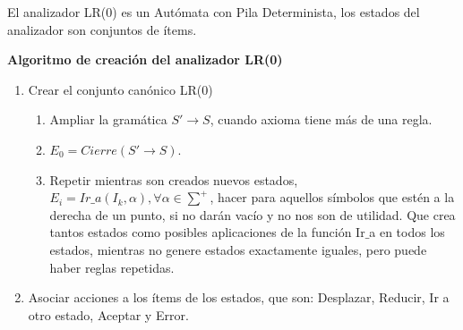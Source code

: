 \documentclass[12pt]{report} %
\begin{document}
El analizador LR(0) es un Autómata con Pila Determinista, los estados del analizador son conjuntos de ítems.

\textbf{Algoritmo de creación del analizador LR(0)}
\begin{enumerate}
  \item Crear el conjunto canónico LR(0)
  \begin{enumerate}
    \item Ampliar la gramática $S'\rightarrow S$, cuando axioma tiene más de una regla.
    \item $E_0 = Cierre(S'\rightarrow S)$.
    \item Repetir mientras son creados nuevos estados, $E_i = Ir\_a(I_k, \alpha), \forall \alpha \in \sum^+$, hacer para aquellos símbolos que estén a la derecha de un punto, si no darán vacío y no nos son de utilidad. Que crea tantos estados como posibles aplicaciones de la función Ir$\_$a en todos los estados, mientras no genere estados exactamente iguales, pero puede haber reglas repetidas.
  \end{enumerate}
  \item Asociar acciones a los ítems de los estados, que son: Desplazar, Reducir, Ir a otro estado, Aceptar y Error.
\end{enumerate}
\end{document}
